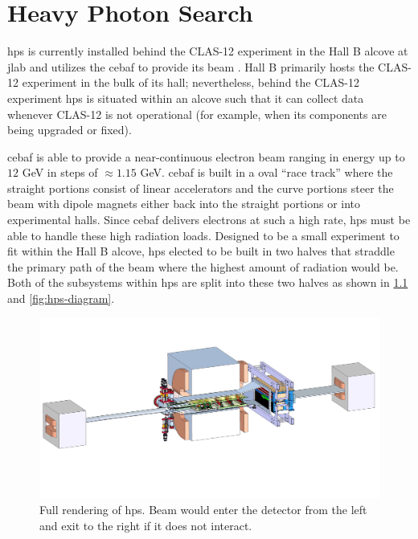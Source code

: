 \chapter{Heavy Photon Search}
\label{chapter:hps:experiment}
\ac{hps} is currently installed behind the CLAS-12 experiment in the Hall B
alcove at \ac{jlab} and utilizes the \ac{cebaf} to provide its beam
\cite{mrsolt-thesis-2020,skmccarty-thesis-2020}.
Hall B primarily hosts the CLAS-12 experiment 
in the bulk of its hall; nevertheless, behind the CLAS-12 experiment \ac{hps} is situated
within an alcove such that it can collect data whenever CLAS-12 is not operational (for example,
when its components are being upgraded or fixed).

\ac{cebaf} \cite{cebaf-12GeV-2012,cebaf-opportunities-2012,cebaf-2013} is able to
provide a near-continuous electron beam ranging in energy up to $12$ GeV in steps
of $\approx 1.15$ GeV. \ac{cebaf} is built in a oval ``race track'' where the straight
portions consist of linear accelerators and the curve portions steer the beam with
dipole magnets either back into the straight portions or into experimental halls.
Since \ac{cebaf} delivers electrons at such a high rate, \ac{hps} must be able to
handle these high radiation loads. Designed to be a small experiment to fit within
the Hall B alcove, \ac{hps} elected to be built in two halves that straddle the primary
path of the beam where the highest amount of radiation would be. Both of the subsystems
within \ac{hps} are split into these two halves as shown in \cref{fig:hps-full-render}
and \cref{fig:hps-diagram}.

\begin{figure}
	\centering
	\includegraphics[trim={15cm 10cm 10cm 5cm},clip,width=\textwidth]{figures/hps/experiment/hps_full_render.jpg}
	\caption{
		Full rendering of \ac{hps}.
		Beam would enter the detector from the left and exit to the right if it does not interact.
	}
	\label{fig:hps-full-render}
\end{figure}

